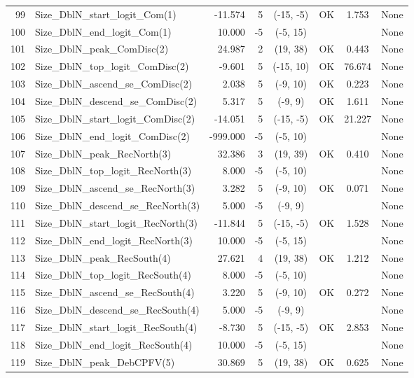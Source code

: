 \documentclass[12pt,]{article}
\begin{document}
\begin{landscape}
\begin{longtable}{rlrrcccl}
  99 & Size\_DblN\_start\_logit\_Com(1) & -11.574 & 5 & (-15, -5) & OK & 1.753 & None \\ 
  100 & Size\_DblN\_end\_logit\_Com(1) & 10.000 & -5 & (-5, 15) &  &  & None \\ 
  101 & Size\_DblN\_peak\_ComDisc(2) & 24.987 & 2 & (19, 38) & OK & 0.443 & None \\ 
  102 & Size\_DblN\_top\_logit\_ComDisc(2) & -9.601 & 5 & (-15, 10) & OK & 76.674 & None \\ 
  103 & Size\_DblN\_ascend\_se\_ComDisc(2) & 2.038 & 5 & (-9, 10) & OK & 0.223 & None \\ 
  104 & Size\_DblN\_descend\_se\_ComDisc(2) & 5.317 & 5 & (-9, 9) & OK & 1.611 & None \\ 
  105 & Size\_DblN\_start\_logit\_ComDisc(2) & -14.051 & 5 & (-15, -5) & OK & 21.227 & None \\ 
  106 & Size\_DblN\_end\_logit\_ComDisc(2) & -999.000 & -5 & (-5, 10) &  &  & None \\ 
  107 & Size\_DblN\_peak\_RecNorth(3) & 32.386 & 3 & (19, 39) & OK & 0.410 & None \\ 
  108 & Size\_DblN\_top\_logit\_RecNorth(3) & 8.000 & -5 & (-5, 10) &  &  & None \\ 
  109 & Size\_DblN\_ascend\_se\_RecNorth(3) & 3.282 & 5 & (-9, 10) & OK & 0.071 & None \\ 
  110 & Size\_DblN\_descend\_se\_RecNorth(3) & 5.000 & -5 & (-9, 9) &  &  & None \\ 
  111 & Size\_DblN\_start\_logit\_RecNorth(3) & -11.844 & 5 & (-15, -5) & OK & 1.528 & None \\ 
  112 & Size\_DblN\_end\_logit\_RecNorth(3) & 10.000 & -5 & (-5, 15) &  &  & None \\ 
  113 & Size\_DblN\_peak\_RecSouth(4) & 27.621 & 4 & (19, 38) & OK & 1.212 & None \\ 
  114 & Size\_DblN\_top\_logit\_RecSouth(4) & 8.000 & -5 & (-5, 10) &  &  & None \\ 
  115 & Size\_DblN\_ascend\_se\_RecSouth(4) & 3.220 & 5 & (-9, 10) & OK & 0.272 & None \\ 
  116 & Size\_DblN\_descend\_se\_RecSouth(4) & 5.000 & -5 & (-9, 9) &  &  & None \\ 
  117 & Size\_DblN\_start\_logit\_RecSouth(4) & -8.730 & 5 & (-15, -5) & OK & 2.853 & None \\ 
  118 & Size\_DblN\_end\_logit\_RecSouth(4) & 10.000 & -5 & (-5, 15) &  &  & None \\ 
  119 & Size\_DblN\_peak\_DebCPFV(5) & 30.869 & 5 & (19, 38) & OK & 0.625 & None \\ 

\end{longtable}
\end{landscape}
\end{document}

